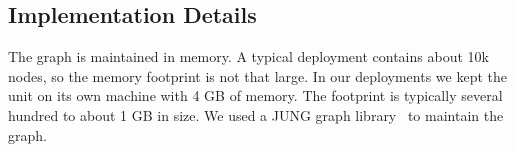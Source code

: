 


\subsection{Implementation Details}
The graph is maintained in memory.  A typical deployment contains about 10k nodes, so the memory footprint is not that large. 
In our deployments we kept the unit on its own machine with 4 GB of memory.  The footprint is typically several hundred to
about 1 GB in size.  We used a JUNG graph library~\cite{jung} to maintain the graph.

